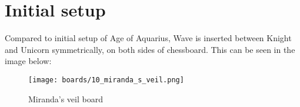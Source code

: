 \clearpage %

\section*{Initial setup}

Compared to initial setup of Age of Aquarius, Wave is inserted between Knight and Unicorn
symmetrically, on both sides of chessboard. This can be seen in the image below:

\noindent
\begin{figure}[h]
\texttt{[image: boards/10\_miranda\_s\_veil.png]}
\caption{Miranda's veil board}
\label{fig:10_miranda_s_veil}
\end{figure}

\clearpage %
